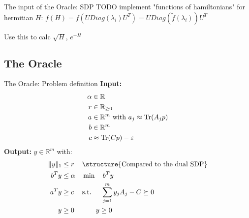 \begin{frame}{The input of the Oracle: SDP}
TODO implement "functions of hamiltonians" for hermitian $H$: $f(H)=f(U Diag(\lambda_i) U^T)=U Diag(\tilde{f}(\lambda_i))U^T$

Use this to calc $\sqrt{H}$, $e^{-H}$
\end{frame}

\subsection{The Oracle}

\begin{frame}{The Oracle: Problem definition}
\textbf{Input: }
\begin{align*}
\alpha&\in\mathbb{R}\\
r&\in \mathbb{R}_{\geq 0}\\
a&\in \mathbb{R}^m \text{ with } a_j\approx \operatorname{Tr}(A_j p)\\
b&\in \mathbb{R}^m\\
c&\approx \operatorname{Tr}(Cp)-\varepsilon
\end{align*}
\textbf{Output: } $y\in \mathbb{R}^m$ with:
\begin{align*}
\|y\|_1&\leq r && \text{\structure{Compared to the dual SDP}}\\
b^T y&\leq \alpha&&\min \quad b^T y\\
a^T y&\geq c&&\text{s.t. } \quad \sum_{j=1}^m y_j A_j - C\succeq 0\\
y&\geq 0 && \qquad y\geq 0
\end{align*}

\end{frame}

